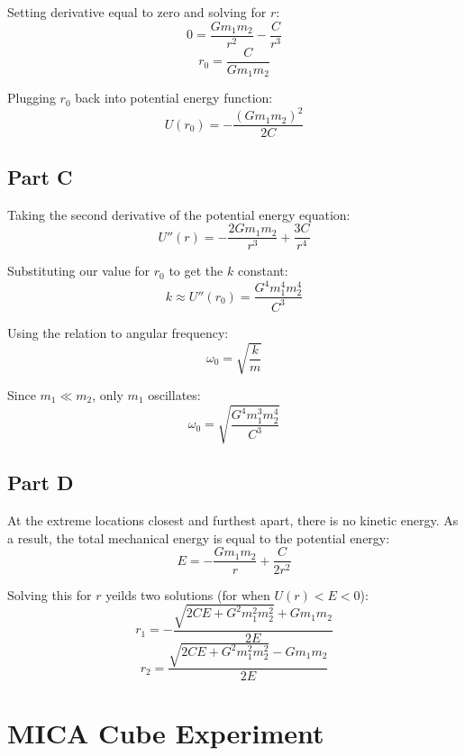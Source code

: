 \documentclass{article}
\begin{document}
Setting derivative equal to zero and solving for $r$:
$$ 0 = \frac{ G m_{1} m_{2} }{ r^{2} } - \frac{ C }{ r^{3} }  $$
$$ r_{0} = \frac{ C }{ G m_{1} m_{2} } $$

Plugging $r_{0}$ back into potential energy function:
$$ U( r_{0} ) = -\frac{ ( G m_{1} m_{2} )^{2} }{ 2 C } $$

\subsection*{ Part C }

Taking the second derivative of the potential energy equation:
$$ U''( r ) = -\frac{ 2 G m_{1} m_{2} }{ r^{3} } + \frac{ 3 C }{ r^{4} } $$

Substituting our value for $r_{0}$ to get the $k$ constant:
$$ k \approx U''( r_{0} ) = \frac{ G^{4} m_{1}^{4} m_{2}^{4} }{ C^{3} } $$

Using the relation to angular frequency:
$$ \omega_{0} = \sqrt{  \frac{ k }{ m } } $$

Since $m_{1} \ll m_{2}$, only $m_{1}$ oscillates:
$$ \omega_{0} = \sqrt{ \frac{ G^{4} m_{1}^{3} m_{2}^{4} }{ C^{3} } } $$

\subsection*{ Part D }

At the extreme locations closest and furthest apart, there is no kinetic energy.
As a result, the total mechanical energy is equal to the potential energy:
$$ E = -\frac{ G m_{1} m_{2} }{ r } + \frac{ C }{ 2 r^{2} } $$

Solving this for $r$ yeilds two solutions (for when $U( r ) < E < 0$):
$$ r_{1} = - \frac{ \sqrt{ 2 C E + G^{2} m_{1}^{2} m_{2}^{2} } + G m_{1} m_{2}
}{ 2 E } $$
$$ r_{2} = \frac{ \sqrt{ 2 C E + G^{2} m_{1}^{2} m_{2}^{2} } - G m_{1} m_{2}
}{ 2 E } $$

\section{ MICA Cube Experiment }
\end{document}

